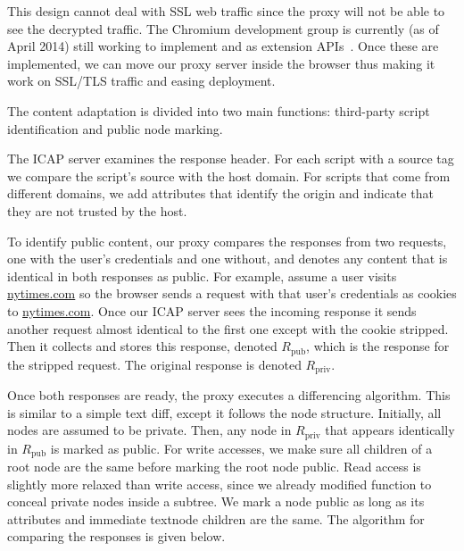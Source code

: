 This design cannot deal with SSL web traffic since the proxy will not be able to see the decrypted traffic.  The Chromium development group is currently (as of April 2014) still working to implement  and  as extension APIs~\cite{webRequest}.  Once these are implemented, we can move our proxy server inside the browser thus making it work on SSL/TLS traffic and easing deployment.  
  
The content adaptation is divided into two main functions: third-party script identification and public node marking.

 The ICAP server examines the response header.  For each script with a source tag we compare the script's source with the host domain.  For scripts that come from different domains, we add  attributes that identify the origin and indicate that they are not trusted by the host. 

 To identify public content, our proxy compares the responses from two requests, one with the user's credentials and one without, and denotes any content that is identical in both responses as public.  For example, assume a user visits \url{nytimes.com} so the browser sends a request with that user's credentials as cookies to \url{nytimes.com}.  Once our ICAP server sees the incoming response it sends another request almost identical to the first one except with the cookie stripped.  Then it collects and stores this response, denoted $R_{\textrm{pub}}$, which is the response for the stripped request.  The original response is denoted $R_{\textrm{priv}}$.  

Once both responses are ready, the proxy executes a differencing algorithm.  This is similar to a simple text diff, except it follows the node structure.  Initially, all nodes are assumed to be private.  Then, any node in $R_{\textrm{priv}}$ that appears identically in $R_{\textrm{pub}}$ is marked as public.  For write accesses, we make sure all children of a root node are the same before marking the root node public.  Read access is slightly more relaxed than write access, since we already modified  function to conceal private nodes inside a subtree.  We mark a node public as long as its attributes and immediate textnode children are the same.  The algorithm for comparing the responses is given below.

